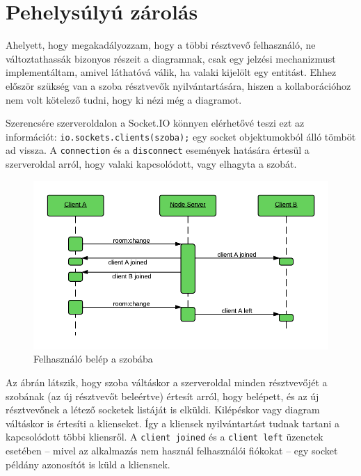 
\section{Pehelysúlyú zárolás}

Ahelyett, hogy megakadályozzam, hogy a többi résztvevő felhasználó, ne változtathassák bizonyos részeit a diagramnak, csak egy jelzési mechanizmust implementáltam, amivel láthatóvá válik, ha valaki kijelölt egy entitást. Ehhez először szükség van a szoba résztvevők nyilvántartására, hiszen a kollaborációhoz nem volt kötelező tudni, hogy ki nézi még a diagramot.

Szerencsére szerveroldalon a Socket.IO könnyen elérhetővé teszi ezt az információt: \lstinline{io.sockets.clients(szoba);} egy socket objektumokból álló tömböt ad vissza. A \lstinline{connection} és a \lstinline{disconnect} események hatására értesül a szerveroldal arról, hogy valaki kapcsolódott, vagy elhagyta a szobát.

\begin{figure}[!ht]
\centering
\includegraphics[width=15cm,keepaspectratio]{figures/join-seq.png}
\caption{Felhasználó belép a szobába}
\label{fig:joinseq}
\end{figure}

Az ábrán látszik, hogy szoba váltáskor a szerveroldal minden résztvevőjét a szobának (az új résztvevőt beleértve) értesít arról, hogy belépett, és az új résztvevőnek a létező socketek listáját is elküldi. Kilépéskor vagy diagram váltáskor is értesíti a klienseket. Így a kliensek nyilvántartást tudnak tartani a kapcsolódott többi kliensről. A \lstinline{client joined} és a \lstinline{client left} üzenetek esetében -- mivel az alkalmazás nem használ felhasználói fiókokat -- egy socket példány azonosítót is küld a kliensnek.

